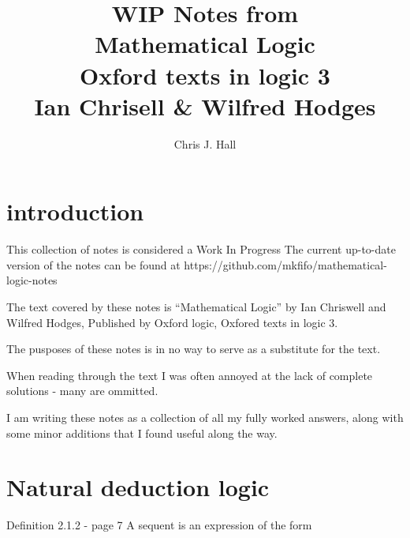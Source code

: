 \documentclass[a4paper, titlepage]{report}
\begin{document}
\newcommand{\RULE}[3]{
  {
  \iffalse
    TODO FIXME automate adding to rules sections
  \fi
  \bigskip
  \textbf{\uppercase{#1 rule (#2 rule)}} - page #3 \\
  \indent
  }
}

\newcommand{\EXERCISE}[3]{
  {
  \iffalse
    TODO FIXME automate adding to exercises list?
  \fi
  \bigskip
  Exercise #1 - page #2 \\
  \indent #3 \\
  \indent
  }
}

\title {WIP Notes from \\ Mathematical Logic \\ Oxford texts in logic 3 \\ Ian Chrisell \& Wilfred Hodges}
\author {Chris J. Hall}
\maketitle


\tableofcontents

\chapter{introduction}

This collection of notes is considered a Work In Progress
The current up-to-date version of the notes can be found at https://github.com/mkfifo/mathematical-logic-notes


The text covered by these notes is ``Mathematical Logic'' by Ian Chriswell and Wilfred Hodges,
Published by Oxford logic, Oxfored texts in logic 3.

The pusposes of these notes is in no way to serve as a substitute for the text.

When reading through the text I was often annoyed at the lack of complete solutions - many are ommitted.


I am writing these notes as a collection of all my fully worked answers, along with some minor additions that I found useful
along the way.


\chapter{Natural deduction logic}


Definition 2.1.2 - page 7
  A sequent is an expression of the form
\end{document}
